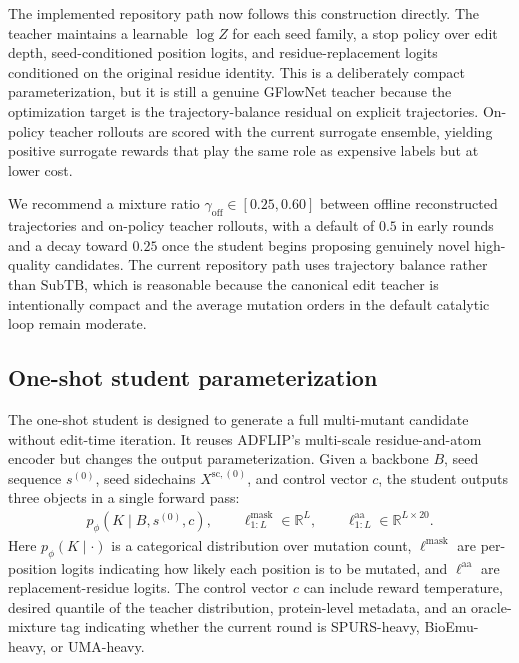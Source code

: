 \documentclass[11pt]{article}
\newcommand{\RR}{\mathbb{R}}
\newcommand{\SubTB}{\ensuremath{\mathrm{SubTB}}}
\begin{document}
	The implemented repository path now follows this construction directly. The teacher maintains a learnable $\log Z$ for each seed family, a stop policy over edit depth, seed-conditioned position logits, and residue-replacement logits conditioned on the original residue identity. This is a deliberately compact parameterization, but it is still a genuine GFlowNet teacher because the optimization target is the trajectory-balance residual on explicit trajectories. On-policy teacher rollouts are scored with the current surrogate ensemble, yielding positive surrogate rewards that play the same role as expensive labels but at lower cost.
	
	We recommend a mixture ratio $\gamma_{\mathrm{off}}\in[0.25,0.60]$ between offline reconstructed trajectories and on-policy teacher rollouts, with a default of $0.5$ in early rounds and a decay toward $0.25$ once the student begins proposing genuinely novel high-quality candidates. The current repository path uses trajectory balance rather than \SubTB{}, which is reasonable because the canonical edit teacher is intentionally compact and the average mutation orders in the default catalytic loop remain moderate.
	
	\subsection{One-shot student parameterization}
	
	The one-shot student is designed to generate a full multi-mutant candidate without edit-time iteration. It reuses ADFLIP's multi-scale residue-and-atom encoder but changes the output parameterization. Given a backbone $B$, seed sequence $s^{(0)}$, seed sidechains $X^{\mathrm{sc},(0)}$, and control vector $c$, the student outputs three objects in a single forward pass:
	\begin{align}
		p_{\phi}(K\mid B,s^{(0)},c),\qquad
		\ell^{\mathrm{mask}}_{1:L}\in\RR^L,\qquad
		\ell^{\mathrm{aa}}_{1:L}\in\RR^{L\times 20}.
	\end{align}
	Here $p_{\phi}(K\mid\cdot)$ is a categorical distribution over mutation count, $\ell^{\mathrm{mask}}$ are per-position logits indicating how likely each position is to be mutated, and $\ell^{\mathrm{aa}}$ are replacement-residue logits. The control vector $c$ can include reward temperature, desired quantile of the teacher distribution, protein-level metadata, and an oracle-mixture tag indicating whether the current round is SPURS-heavy, BioEmu-heavy, or UMA-heavy.
	
\end{document}

